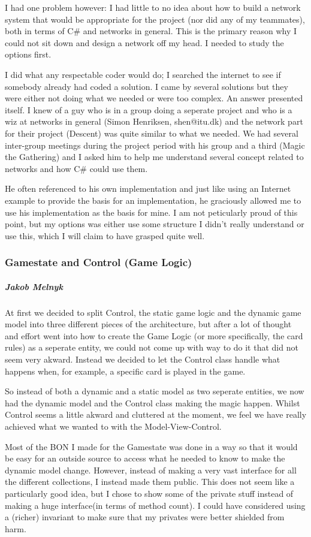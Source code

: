 I had one problem however: I had little to no idea about how to build a network system that would be appropriate for the project (nor did any of my teammates), both in terms of C\# and networks in general. 
This is the primary reason why I could not sit down and design a network off my head. I needed to study the options first.

I did what any respectable coder would do; I searched the internet to see if somebody already had coded a solution. 
I came by several solutions but they were either not doing what we needed or were too complex.
An answer presented itself. I knew of a guy who is in a group doing a seperate project and who is a wiz at networks in general (Simon Henriksen, shen@itu.dk) and the network part for their project (Descent) was quite similar to what we needed. 
We had several inter-group meetings during the project period with his group and a third (Magic the Gathering) and I asked him to help me understand several concept related to networks and how C\# could use them.

He often referenced to his own implementation and just like using an Internet example to provide the basis for an implementation, he graciously allowed me to use his implementation as the basis for mine.
I am not peticularly proud of this point, but my options was either use some structure I didn't really understand or use this, which I will claim to have grasped quite well.

\subsubsection{Gamestate and Control (Game Logic)}
\subparagraph{Jakob Melnyk}
At first we decided to split Control, the static game logic and the dynamic game model into three different pieces of the architecture, but after a lot of thought and effort went into how to create the Game Logic (or more specifically, the card rules) as a seperate entity, we could not come up with way to do it that did not seem very akward. Instead we decided to let the Control class handle what happens when, for example, a specific card is played in the game.

So instead of both a dynamic and a static model as two seperate entities, we now had the dynamic model and the Control class making the magic happen. Whilst Control seems a little akward and cluttered at the moment, we feel we have really achieved what we wanted to with the Model-View-Control.

Most of the BON I made for the Gamestate was done in a way so that it would be easy for an outside source to access what he needed to know to make the dynamic model change. However, instead of making a very vast interface for all the different collections, I instead made them public. This does not seem like a particularly good idea, but I chose to show some of the private stuff instead of making a huge interface(in terms of method count). I could have considered using a (richer) invariant to make sure that my privates were better shielded from harm.


